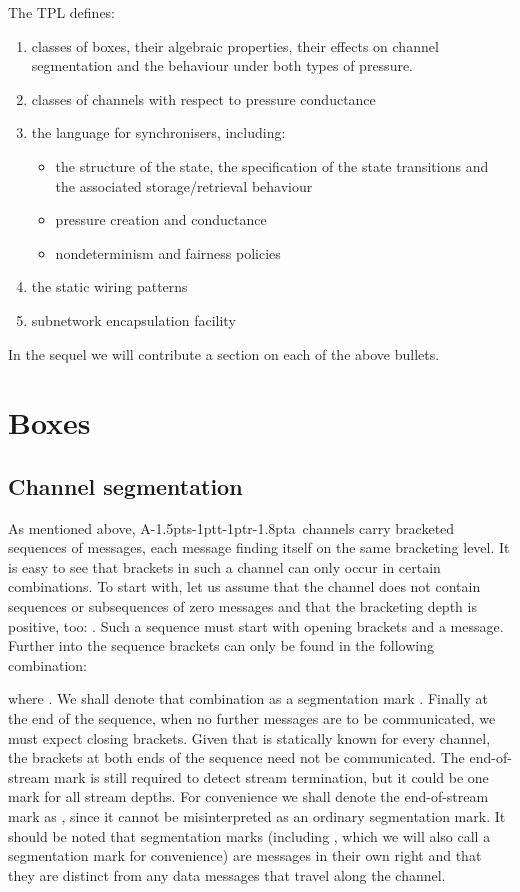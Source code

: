 \documentclass[11pt]{report}
\def\ak{{\textsf{A\kern-1.5pts\kern-1ptt\kern-1ptr\kern-1.8pta}}\kern-2pt{\it K\kern-2ptahn}}
\begin{document}
The TPL defines:
\begin{enumerate}
\item classes of boxes, their algebraic properties, their effects on channel segmentation and the behaviour under both types of pressure.
\item classes of channels with respect to pressure conductance
\item the language for synchronisers, including:
	\begin{itemize}
		\item the structure of the state, the specification of the state transitions and the associated storage/retrieval behaviour
		\item pressure creation and conductance
		\item nondeterminism and fairness policies
	\end{itemize}
\item the static wiring patterns
\item subnetwork encapsulation facility
\end{enumerate}

In the sequel we will contribute a section on each of the above bullets.

\section{Boxes}

\subsection{Channel segmentation}

As mentioned above, \ak\ channels carry bracketed sequences of messages, each message finding itself on the same bracketing level.
It is easy to see that brackets in such a channel can only occur in certain combinations. To start with, let us assume that the
channel does not contain sequences or subsequences of zero messages and that the bracketing depth is positive, too: .
Such a sequence must start with  opening brackets and a message. Further into the sequence brackets can only
be found in the following combination:

where . We shall denote that combination as a segmentation mark . Finally at the end of the sequence, when no further
messages are to be communicated, we must expect  closing brackets. Given that  is statically known for every channel, the
brackets at both ends of the sequence need not be communicated. The end-of-stream mark is still required to detect stream termination,
but it could be one mark for all stream depths. For convenience we shall denote the end-of-stream mark as , since it cannot be
misinterpreted as an ordinary segmentation mark. It should be noted that segmentation marks (including , which we will also call
a segmentation mark for convenience) are messages in their own right and that they are distinct from any data messages
that travel along the channel.
\end{document}
